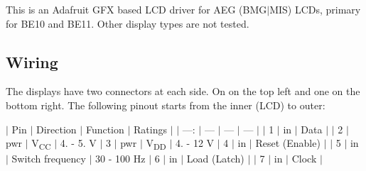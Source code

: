 This is an Adafruit G\+FX based L\+CD driver for A\+EG (B\+M\+G$\vert$\+M\+IS) L\+C\+Ds, primary for B\+E10 and B\+E11. Other display types are not tested.

\subsection*{Wiring}

The displays have two connectors at each side. On on the top left and one on the bottom right. The following pinout starts from the inner (L\+CD) to outer\+:

$\vert$ Pin $\vert$ Direction $\vert$ Function $\vert$ Ratings $\vert$ $\vert$ ---\+: $\vert$ --- $\vert$ --- $\vert$ --- $\vert$ $\vert$ 1 $\vert$ in $\vert$ Data $\vert$ $\vert$ 2 $\vert$ pwr $\vert$ V\textsubscript{CC} $\vert$ 4. -\/ 5. V $\vert$ 3 $\vert$ pwr $\vert$ V\textsubscript{DD} $\vert$ 4. -\/ 12 V $\vert$ 4 $\vert$ in $\vert$ Reset (Enable) $\vert$ $\vert$ 5 $\vert$ in $\vert$ Switch frequency $\vert$ 30 -\/ 100 Hz $\vert$ 6 $\vert$ in $\vert$ Load (Latch) $\vert$ $\vert$ 7 $\vert$ in $\vert$ Clock $\vert$ 